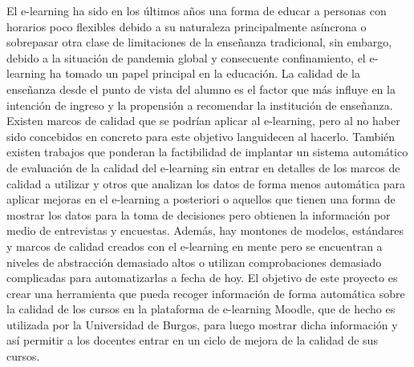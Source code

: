 
El e-learning ha sido en los últimos años una forma de educar a personas con horarios poco flexibles debido a su naturaleza principalmente asíncrona o sobrepasar otra clase de limitaciones de la enseñanza tradicional, sin embargo, debido a la situación de pandemia global y consecuente confinamiento, el e-learning ha tomado un papel principal en la educación\cite{muhammad2020hierarchical}.
La calidad de la enseñanza desde el punto de vista del alumno es el factor que más influye en la intención de ingreso y la propensión a recomendar la institución de enseñanza\cite{martinez2016perceived}.
Existen marcos de calidad que se podrían aplicar al e-learning, pero al no haber sido concebidos en concreto para este objetivo languidecen al hacerlo\cite{muhammad2020hierarchical}.
También existen trabajos que ponderan la factibilidad de implantar un sistema automático de evaluación de la calidad del e-learning sin entrar en detalles de los marcos de calidad a utilizar\cite{doneva2015automated} y otros que analizan los datos de forma menos automática para aplicar mejoras en el e-learning a posteriori\cite{ueda2017data} o aquellos que tienen una forma de mostrar los datos para la toma de decisiones pero obtienen la información por medio de entrevistas y encuestas\cite{mejia2020dashboard}.
Además, hay montones de modelos, estándares y marcos de calidad creados con el e-learning en mente pero se encuentran a niveles de abstracción demasiado altos o utilizan comprobaciones demasiado complicadas para automatizarlas a fecha de hoy.
El objetivo de este proyecto es crear una herramienta que pueda recoger información de forma automática sobre la calidad de los cursos en la plataforma de e-learning Moodle, que de hecho es utilizada por la Universidad de Burgos, para luego mostrar dicha información y así permitir a los docentes entrar en un ciclo de mejora de la calidad de sus cursos.
